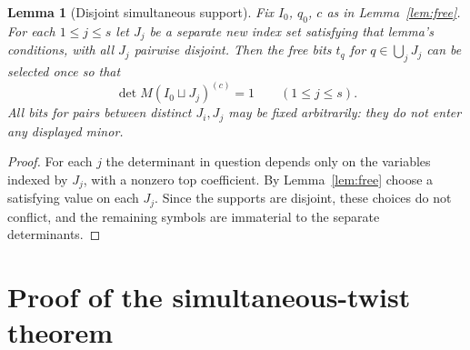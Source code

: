 \documentclass[11pt,a4paper]{article}
\newtheorem{lemma}[theorem]{Lemma}
\theoremstyle{definition}
\begin{document}
\begin{lemma}[Disjoint simultaneous support]\label{lem:disjoint}
Fix $I_0$, $q_0$, $c$ as in Lemma~\ref{lem:free}.
For each $1\le j\le s$ let $J_j$ be a separate new
index set satisfying that lemma's conditions, with all
$J_j$ pairwise disjoint.  Then the free bits
$t_q$ for $q\in\bigcup_jJ_j$ can be selected once so that
\[
            \det M(I_0\sqcup J_j)^{(c)}=1
                              \qquad(1\le j\le s).
\]
All bits for pairs between distinct $J_i,J_j$ may be
fixed arbitrarily: they do not enter any displayed minor.
\end{lemma}
\begin{proof}
For each $j$ the determinant in question depends only
on the variables indexed by $J_j$, with a nonzero top
coefficient.  By Lemma~\ref{lem:free} choose a satisfying
value on each $J_j$.  Since the supports are disjoint,
these choices do not conflict, and the remaining symbols
are immaterial to the separate determinants.
\end{proof}

\section{Proof of the simultaneous-twist theorem}\label{sec:proof}
\end{document}
